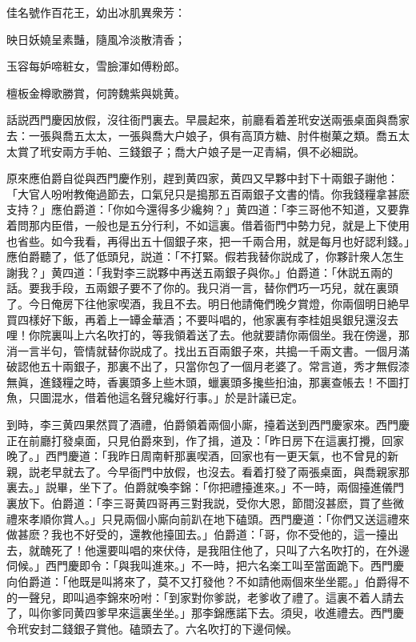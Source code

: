 佳名號作百花王，幼出冰肌異衆芳：

映日妖嬈呈素豔，隨風冷淡散清香；

玉容每妒啼粧女，雪臉渾如傅粉郎。

檀板金樽歌勝賞，何誇魏紫與姚黄。

話説西門慶因放假，沒往衙門裏去。早晨起來，前廳看着差玳安送兩張桌面與喬家去：一張與喬五太太，一張與喬大户娘子，俱有高頂方糖、肘件樹菓之類。喬五太太賞了玳安兩方手帕、三錢銀子；喬大户娘子是一疋青絹，俱不必細説。

原來應伯爵自從與西門慶作别，趕到黄四家，黄四又早夥中封下十兩銀子謝他：「大官人吩咐教俺過節去，口氣兒只是搗那五百兩銀子文書的情。你我錢糧拿甚麽支持？」應伯爵道：「你如今還得多少纔夠？」黄四道：「李三哥他不知道，又要靠着問那内臣借，一般也是五分行利，不如這裏。借着衙門中勢力兒，就是上下使用也省些。如今我看，再得出五十個銀子來，把一千兩合用，就是每月也好認利錢。」應伯爵聽了，低了低頭兒，説道：「不打緊。假若我替你説成了，你夥計衆人怎生謝我？」黄四道：「我對李三説夥中再送五兩銀子與你。」伯爵道：「休説五兩的話。要我手段，五兩銀子要不了你的。我只消一言，替你們巧一巧兒，就在裏頭了。今日俺房下往他家喫酒，我且不去。明日他請俺們晚夕賞燈，你兩個明日絶早買四樣好下飯，再着上一罈金華酒；不要呌唱的，他家裏有李桂姐吳銀兒還沒去哩！你院裏叫上六名吹打的，等我領着送了去。他就要請你兩個坐。我在傍邊，那消一言半句，管情就替你説成了。找出五百兩銀子來，共搗一千兩文書。一個月滿破認他五十兩銀子，那裏不出了，只當你包了一個月老婆了。常言道，秀才無假漆無眞，進錢糧之時，香裏頭多上些木頭，蠟裏頭多攙些㧮油，那裏查帳去！不圖打魚，只圖混水，借着他這名聲兒纔好行事。」於是計議已定。

到時，李三黄四果然買了酒禮，伯爵領着兩個小廝，擡着送到西門慶家來。西門慶正在前廳打發桌面，只見伯爵來到，作了揖，道及：「昨日房下在這裏打攪，回家晚了。」西門慶道：「我昨日周南軒那裏喫酒，回家也有一更天氣，也不曾見的新親，説老早就去了。今早衙門中放假，也沒去。看着打發了兩張桌面，與喬親家那裏去。」説畢，坐下了。伯爵就喚李錦：「你把禮擡進來。」不一時，兩個擡進儀門裏放下。伯爵道：「李三哥黄四哥再三對我説，受你大恩，節間沒甚麽，買了些微禮來孝順你賞人。」只見兩個小廝向前趴在地下磕頭。西門慶道：「你們又送這禮來做甚麽？我也不好受的，還教他擡囬去。」伯爵道：「哥，你不受他的，這一擡出去，就醜死了！他還要叫唱的來伏侍，是我阻住他了，只叫了六名吹打的，在外邊伺候。」西門慶即令：「與我叫進來。」不一時，把六名楽工叫至當面跪下。西門慶向伯爵道：「他既是叫將來了，莫不又打發他？不如請他兩個來坐坐罷。」伯爵得不的一聲兒，即叫過李錦來吩咐：「到家對你爹説，老爹收了禮了。這裏不着人請去了，叫你爹同黄四爹早來這裏坐坐。」那李錦應諾下去。須臾，收進禮去。西門慶令玳安封二錢銀子賞他。磕頭去了。六名吹打的下邊伺候。

